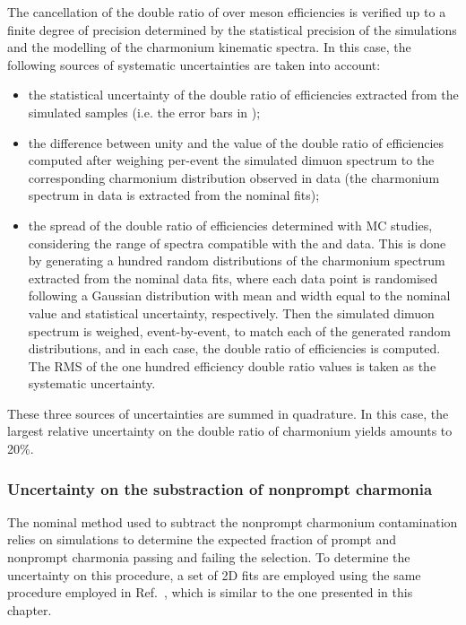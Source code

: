 The cancellation of the double ratio of \PsiP over \JPsi meson efficiencies is verified up to a finite degree of precision determined by the statistical precision of the simulations and the modelling of the charmonium kinematic spectra. In this case, the following sources of systematic uncertainties are taken into account: 
\begin{itemize}
 \item the statistical uncertainty of the double ratio of efficiencies extracted from the simulated samples (i.e. the error bars in );
 \item the difference between unity and the value of the double ratio of efficiencies computed after weighing per-event the simulated dimuon \pt spectrum to the corresponding charmonium \pt distribution observed in data (the charmonium \pt spectrum in data is extracted from the nominal fits);
 \item the spread of the double ratio of efficiencies determined with MC studies, considering the range of \pt spectra compatible with the \RunPbPb and \Runpp data. This is done by generating a hundred random \pt distributions of the charmonium \pt spectrum extracted from the nominal data fits, where each data point is randomised following a Gaussian distribution with mean and width equal to the nominal value and statistical uncertainty, respectively. Then the simulated dimuon \pt spectrum is weighed, event-by-event, to match each of the generated random \pt distributions, and in each case, the double ratio of efficiencies is computed. The RMS of the one hundred efficiency double ratio values is taken as the systematic uncertainty.
\end{itemize}

These three sources of uncertainties are summed in quadrature. In this case, the largest relative uncertainty on the double ratio of charmonium yields amounts to 20\%.

\subsubsection{Uncertainty on the substraction of nonprompt charmonia}\label{sec:Charmonia_Analysis_PsiPoverJPsiRatioSystematics_NPCorr}

The nominal method used to subtract the nonprompt charmonium contamination relies on simulations to determine the expected fraction of prompt and nonprompt charmonia passing and failing the \ctau selection. To determine the uncertainty on this procedure, a set of 2D fits are employed using the same procedure employed in Ref.~\cite{CMS_JPsi_PbPb_2p76TeV}, which is similar to the one presented in this chapter.

